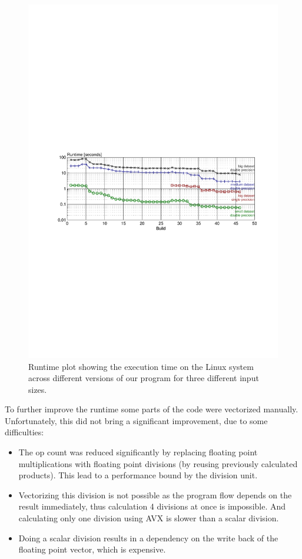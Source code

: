 \begin{figure}\centering
  \includegraphics[scale = 1, trim={7cm 11cm 6cm 14cm}]{graphics/runtime_plot.pdf}
  \caption{Runtime plot showing the execution time on the Linux system across different versions of our program for three different input sizes.\label{runtime}}
\end{figure}

To further improve the runtime some parts of the code were vectorized manually. Unfortunately, this did not bring a significant improvement, due to some difficulties:
\begin{itemize}
	\item The op count was reduced significantly by replacing floating point multiplications with floating point divisions (by reusing previously calculated products). This lead to a performance bound by the division unit.
	\item Vectorizing this division is not possible as the program flow depends on the result immediately, thus calculation 4 divisions at once is impossible. And calculating only one division using AVX is slower than a scalar division.
	\item Doing a scalar division results in a dependency on the write back of the floating point vector, which is expensive.
\end{itemize}

